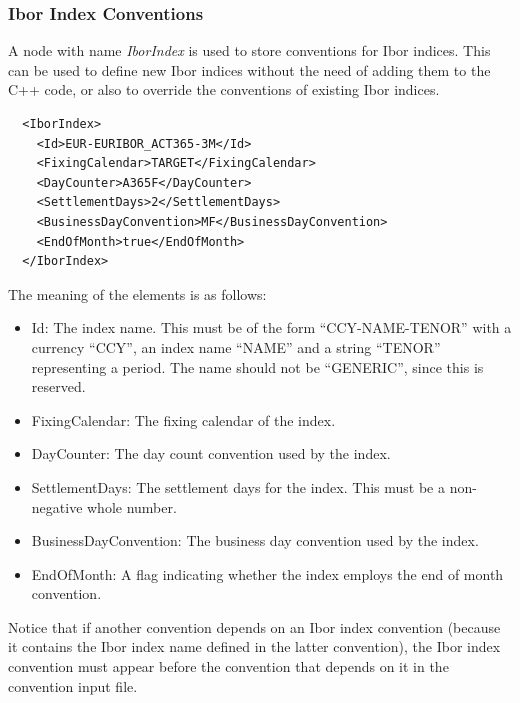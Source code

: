 \subsubsection{Ibor Index Conventions}

A node with name \emph{IborIndex} is used to store conventions for Ibor indices. This can be used to define new Ibor
indices without the need of adding them to the C++ code, or also to override the conventions of existing Ibor indices.

\begin{listing}[H]
\begin{verbatim}
  <IborIndex>
    <Id>EUR-EURIBOR_ACT365-3M</Id>
    <FixingCalendar>TARGET</FixingCalendar>
    <DayCounter>A365F</DayCounter>
    <SettlementDays>2</SettlementDays>
    <BusinessDayConvention>MF</BusinessDayConvention>
    <EndOfMonth>true</EndOfMonth>
  </IborIndex>
\end{verbatim}
\caption{Ibor index convention}
\label{lst:ibor_index_conventions}
\end{listing}

The meaning of the elements is as follows:

\begin{itemize}
\item Id: The index name. This must be of the form ``CCY-NAME-TENOR'' with a currency ``CCY'', an index name ``NAME''
  and a string ``TENOR'' representing a period. The name should not be ``GENERIC'', since this is reserved.
\item FixingCalendar: The fixing calendar of the index.
\item DayCounter: The day count convention used by the index.
\item SettlementDays: The settlement days for the index. This must be a non-negative whole number.
\item BusinessDayConvention: The business day convention used by the index.
\item EndOfMonth: A flag indicating whether the index employs the end of month convention.
\end{itemize}

Notice that if another convention depends on an Ibor index convention (because it contains the Ibor index name defined
in the latter convention), the Ibor index convention must appear before the convention that depends on it in the
convention input file.

